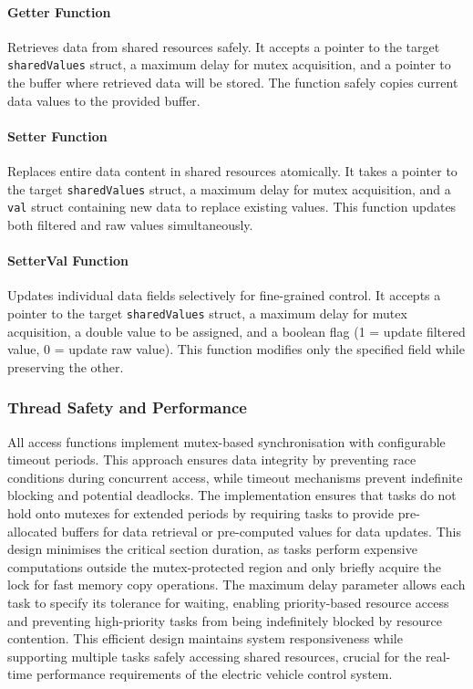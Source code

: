 \documentclass[a4paper, 11pt, titlepage]{article}
\begin{document}
\paragraph{Getter Function}
Retrieves data from shared resources safely. It accepts a pointer to the target \verb|sharedValues| struct, a maximum delay for mutex acquisition, and a pointer to the buffer where retrieved data will be stored. The function safely copies current data values to the provided buffer.

\paragraph{Setter Function}
Replaces entire data content in shared resources atomically. It takes a pointer to the target \verb|sharedValues| struct, a maximum delay for mutex acquisition, and a \verb|val| struct containing new data to replace existing values. This function updates both filtered and raw values simultaneously.

\paragraph{SetterVal Function}
Updates individual data fields selectively for fine-grained control. It accepts a pointer to the target \verb|sharedValues| struct, a maximum delay for mutex acquisition, a double value to be assigned, and a boolean flag (1 = update filtered value, 0 = update raw value). This function modifies only the specified field while preserving the other.

\subsubsection{Thread Safety and Performance}
All access functions implement mutex-based synchronisation with configurable timeout periods. This approach ensures data integrity by preventing race conditions during concurrent access, while timeout mechanisms prevent indefinite blocking and potential deadlocks. The implementation ensures that tasks do not hold onto mutexes for extended periods by requiring tasks to provide pre-allocated buffers for data retrieval or pre-computed values for data updates. This design minimises the critical section duration, as tasks perform expensive computations outside the mutex-protected region and only briefly acquire the lock for fast memory copy operations. The maximum delay parameter allows each task to specify its tolerance for waiting, enabling priority-based resource access and preventing high-priority tasks from being indefinitely blocked by resource contention. This efficient design maintains system responsiveness while supporting multiple tasks safely accessing shared resources, crucial for the real-time performance requirements of the electric vehicle control system. \parencite{freertos}
\end{document}
